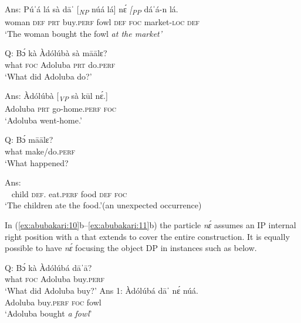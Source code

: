 \documentclass[output=paper,modfonts,nonflat,
\ChapterDOI{10.5281/zenodo.3367154}
 hidelinks
]{langsci/langscibook}
\begin{document}
\ex\label{ex:abubakari:9b}
Ans: \gll Púˈá  lá  sà  dāˈ  [\textit{\textsubscript{NP} } núá  lá]  nɛ́  \textit{[\textsubscript{PP} } dáˈá-n          lá.\\
woman  \textsc{def}   \textsc{prt}  buy.\textsc{perf} {} fowl  \textsc{def}  \textsc{foc} {} market-\textsc{loc}   \textsc{def}\\
 \glt    ‘The woman bought the fowl \textit{at the market’}

\z
\z 
 
\ea\label{ex:abubakari:10}
\ea\label{ex:abubakari:10a} 
Q: \gll Bɔ́  kà  Àdólúbà  sà  māālɛ?         \\
what  \textsc{foc}  Adoluba  \textsc{prt}  do.\textsc{perf}\\              
\glt ‘What did Adoluba do?’        

\ex\label{ex:abubakari:10b}
Ans: \gll Àdólúbà  [\textit{\textsubscript{VP}	} sà  kūl      nɛ́.]\\
Adoluba {}   \textsc{prt}  go-home.\textsc{perf}   \textsc{foc}\\
\glt ‘Adoluba went-home.’
\z
\z
 
\ea\label{ex:abubakari:11}
\ea\label{ex:abubakari:11a}
Q: \gll Bɔ́  māālɛ? \\
what  make/do.\textsc{perf}\\                                            
\glt ‘What happened?   

\ex\label{ex:abubakari:11b}
Ans: \\
~ child   \textsc{def}.  eat.\textsc{perf}  food  \textsc{def}  \textsc{foc}\\
\glt ‘The children ate the food.’(an unexpected occurrence)   
\z
\z

\newpage 
In (\ref{ex:abubakari:10}b--\ref{ex:abubakari:11}b) the particle \textit{nɛ́} assumes an IP internal right position with a  that extends to cover the entire construction. It is equally possible to have \textit{nɛ́} focusing the object DP in instances such as below.

 
\ea\label{ex:abubakari:12}
\ea\label{ex:abubakari:12a} 
Q: \gll Bɔ́  kà  Àdólúbá  dāˈā?\\
what  \textsc{foc}  Adoluba  buy.\textsc{perf}\\
\glt ‘What did Adoluba buy?’
\ex\label{ex:abubakari:12b} 
Ans 1: \gll Àdólúbá  dāˈ    nɛ́  núá.     \\
Adoluba   buy.\textsc{perf}  \textsc{foc}  fowl\\
\glt ‘Adoluba bought \textit{a fowl}’
 
\end{document}
